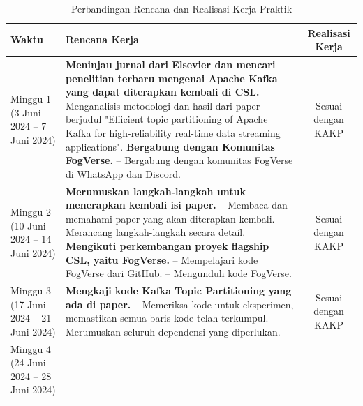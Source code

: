 \begin{longtable}{|p{2.6cm}|p{8cm}|c|}
	\caption{Perbandingan Rencana dan Realisasi Kerja Praktik}
	\label{tab:realisasi-kerja} \\
	\hline
    \textbf{Waktu} & \textbf{Rencana Kerja} & \textbf{Realisasi Kerja} \\
    \hline
    Minggu 1\newline
	(3 Juni 2024 -- 7 Juni 2024) &
	\textbf{Meninjau jurnal dari Elsevier dan mencari penelitian terbaru mengenai Apache Kafka yang dapat diterapkan kembali di CSL.}\newline
	-- Menganalisis metodologi dan hasil dari paper berjudul "Efficient topic partitioning of Apache Kafka for high-reliability real-time data streaming applications".\vspace{0.5cm}\newline
	\textbf{Bergabung dengan Komunitas FogVerse.}\newline
	-- Bergabung dengan komunitas FogVerse di WhatsApp dan Discord.\vspace{0.5cm} &
	Sesuai dengan KAKP \\
    \hline
    Minggu 2\newline
	(10 Juni 2024 -- 14 Juni 2024) &
	\textbf{Merumuskan langkah-langkah untuk menerapkan kembali isi paper.}\newline
	-- Membaca dan memahami paper yang akan	diterapkan kembali.\newline
	-- Merancang langkah-langkah secara detail.\vspace{0.5cm}\newline
	\textbf{Mengikuti perkembangan proyek flagship CSL, yaitu FogVerse.}\newline
	-- Mempelajari kode FogVerse dari GitHub.\newline
	-- Mengunduh kode FogVerse.\vspace{0.5cm} &
	Sesuai dengan KAKP \\
	\hline
    Minggu 3\newline
	(17 Juni 2024 -- 21 Juni 2024) &
	\textbf{Mengkaji kode Kafka Topic Partitioning yang ada	di paper.}\newline
	-- Memeriksa kode untuk eksperimen, memastikan semua baris kode telah terkumpul.\newline
	-- Merumuskan seluruh dependensi yang diperlukan.\vspace{0.5cm} &
	Sesuai dengan KAKP \\
	\hline
    Minggu 4\newline
	(24 Juni 2024 -- 28 Juni 2024) &

\end{longtable}
